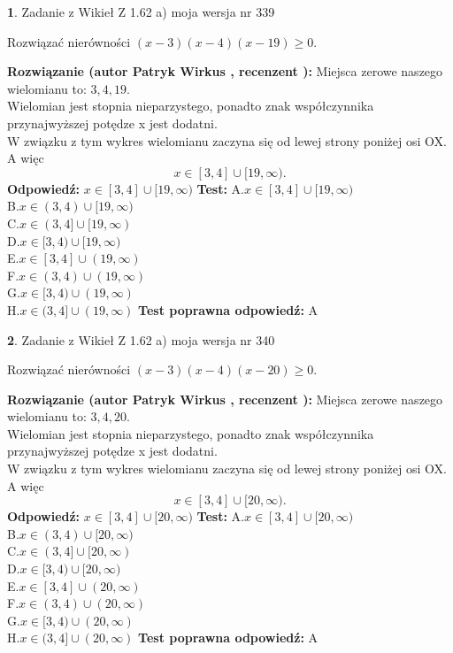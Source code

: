\documentclass[12pt, a4paper]{article}
\theoremstyle{definition} %
\newtheorem{zad}{}
\newcommand{\zadStart}[1]{\begin{zad}#1\newline}
\newcommand{\zadStop}{\end{zad}}
\newcommand{\rozwStart}[2]{\noindent \textbf{Rozwiązanie (autor #1 , recenzent #2): }\newline}
\newcommand{\rozwStop}{\newline}
\newcommand{\odpStart}{\noindent \textbf{Odpowiedź:}\newline}
\newcommand{\odpStop}{\newline}
\newcommand{\testStart}{\noindent \textbf{Test:}\newline}
\newcommand{\testStop}{\newline}
\newcommand{\kluczStart}{\noindent \textbf{Test poprawna odpowiedź:}\newline}
\newcommand{\kluczStop}{\newline}
\begin{document}
\zadStart{Zadanie z Wikieł Z 1.62 a) moja wersja nr 339}

Rozwiązać nierówności $(x-3)(x-4)(x-19)\ge0$.
\zadStop
\rozwStart{Patryk Wirkus}{}
Miejsca zerowe naszego wielomianu to: $3, 4, 19$.\\
Wielomian jest stopnia nieparzystego, ponadto znak współczynnika przy\linebreak najwyższej potędze x jest dodatni.\\ W związku z tym wykres wielomianu zaczyna się od lewej strony poniżej osi OX. A więc $$x \in [3,4] \cup [19,\infty).$$
\rozwStop
\odpStart
$x \in [3,4] \cup [19,\infty)$
\odpStop
\testStart
A.$x \in [3,4] \cup [19,\infty)$\\
B.$x \in (3,4) \cup [19,\infty)$\\
C.$x \in (3,4] \cup [19,\infty)$\\
D.$x \in [3,4) \cup [19,\infty)$\\
E.$x \in [3,4] \cup (19,\infty)$\\
F.$x \in (3,4) \cup (19,\infty)$\\
G.$x \in [3,4) \cup (19,\infty)$\\
H.$x \in (3,4] \cup (19,\infty)$
\testStop
\kluczStart
A
\kluczStop



\zadStart{Zadanie z Wikieł Z 1.62 a) moja wersja nr 340}

Rozwiązać nierówności $(x-3)(x-4)(x-20)\ge0$.
\zadStop
\rozwStart{Patryk Wirkus}{}
Miejsca zerowe naszego wielomianu to: $3, 4, 20$.\\
Wielomian jest stopnia nieparzystego, ponadto znak współczynnika przy\linebreak najwyższej potędze x jest dodatni.\\ W związku z tym wykres wielomianu zaczyna się od lewej strony poniżej osi OX. A więc $$x \in [3,4] \cup [20,\infty).$$
\rozwStop
\odpStart
$x \in [3,4] \cup [20,\infty)$
\odpStop
\testStart
A.$x \in [3,4] \cup [20,\infty)$\\
B.$x \in (3,4) \cup [20,\infty)$\\
C.$x \in (3,4] \cup [20,\infty)$\\
D.$x \in [3,4) \cup [20,\infty)$\\
E.$x \in [3,4] \cup (20,\infty)$\\
F.$x \in (3,4) \cup (20,\infty)$\\
G.$x \in [3,4) \cup (20,\infty)$\\
H.$x \in (3,4] \cup (20,\infty)$
\testStop
\kluczStart
A
\kluczStop
\end{document}

